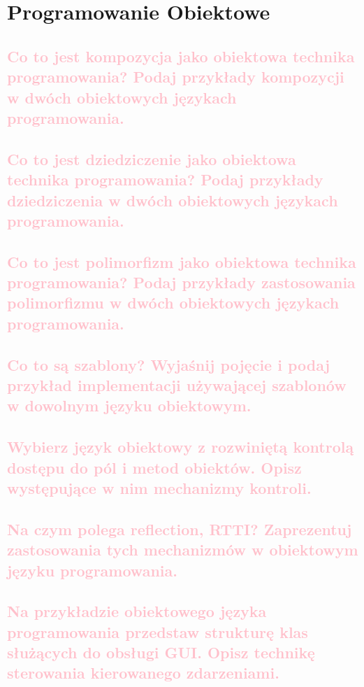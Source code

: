 \chapter{Programowanie Obiektowe}

\section{\textcolor{pink}{Co to jest kompozycja jako obiektowa technika programowania? Podaj przykłady kompozycji w dwóch obiektowych językach programowania.}}

\section{\textcolor{pink}{Co to jest dziedziczenie jako obiektowa technika programowania? Podaj przykłady dziedziczenia w dwóch obiektowych językach programowania.}}

\section{\textcolor{pink}{Co to jest polimorfizm jako obiektowa technika programowania? Podaj przykłady zastosowania polimorfizmu w dwóch obiektowych językach programowania.}}

\section{\textcolor{pink}{Co to są szablony? Wyjaśnij pojęcie i podaj przykład implementacji używającej szablonów w dowolnym języku obiektowym.}}

\section{\textcolor{pink}{Wybierz język obiektowy z rozwiniętą kontrolą dostępu do pól i metod obiektów. Opisz występujące w nim mechanizmy kontroli.}}

\section{\textcolor{pink}{Na czym polega reflection, RTTI? Zaprezentuj zastosowania tych mechanizmów w obiektowym języku programowania.}}

\section{\textcolor{pink}{Na przykładzie obiektowego języka programowania przedstaw strukturę klas służących do obsługi GUI. Opisz technikę sterowania kierowanego zdarzeniami.}}

